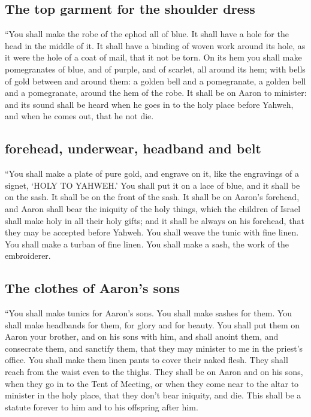 \hypertarget{the-top-garment-for-the-shoulder-dress}{%
\subsection{The top garment for the shoulder
dress}\label{the-top-garment-for-the-shoulder-dress}}

 ``You shall make the robe of the ephod all of blue.
 It shall have a hole for the head in the middle of it.
It shall have a binding of woven work around its hole, as it were the
hole of a coat of mail, that it not be torn.  On its hem
you shall make pomegranates of blue, and of purple, and of scarlet, all
around its hem; with bells of gold between and around them:
 a golden bell and a pomegranate, a golden bell and a
pomegranate, around the hem of the robe.  It shall be on
Aaron to minister: and its sound shall be heard when he goes in to the
holy place before Yahweh, and when he comes out, that he not die.

\hypertarget{forehead-underwear-headband-and-belt}{%
\subsection{forehead, underwear, headband and
belt}\label{forehead-underwear-headband-and-belt}}

 ``You shall make a plate of pure gold, and engrave on
it, like the engravings of a signet, `HOLY TO YAHWEH.' 
You shall put it on a lace of blue, and it shall be on the sash. It
shall be on the front of the sash.  It shall be on
Aaron's forehead, and Aaron shall bear the iniquity of the holy things,
which the children of Israel shall make holy in all their holy gifts;
and it shall be always on his forehead, that they may be accepted before
Yahweh.  You shall weave the tunic with fine linen. You
shall make a turban of fine linen. You shall make a sash, the work of
the embroiderer.

\hypertarget{the-clothes-of-aarons-sons}{%
\subsection{The clothes of Aaron's
sons}\label{the-clothes-of-aarons-sons}}

 ``You shall make tunics for Aaron's sons. You shall make
sashes for them. You shall make headbands for them, for glory and for
beauty.  You shall put them on Aaron your brother, and on
his sons with him, and shall anoint them, and consecrate them, and
sanctify them, that they may minister to me in the priest's office.
 You shall make them linen pants to cover their naked
flesh. They shall reach from the waist even to the thighs.
 They shall be on Aaron and on his sons, when they go in
to the Tent of Meeting, or when they come near to the altar to minister
in the holy place, that they don't bear iniquity, and die. This shall be
a statute forever to him and to his offspring after him.

